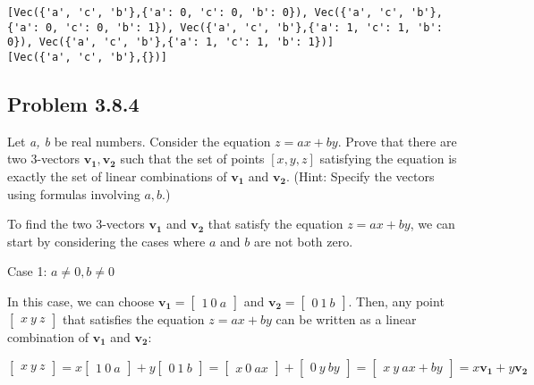 \documentclass[
  letterpaper,
  DIV=11,
  numbers=noendperiod]{scrartcl}
\begin{document}
\begin{lstlisting}
[Vec({'a', 'c', 'b'},{'a': 0, 'c': 0, 'b': 0}), Vec({'a', 'c', 'b'},{'a': 0, 'c': 0, 'b': 1}), Vec({'a', 'c', 'b'},{'a': 1, 'c': 1, 'b': 0}), Vec({'a', 'c', 'b'},{'a': 1, 'c': 1, 'b': 1})]
[Vec({'a', 'c', 'b'},{})]
\end{lstlisting}

\newpage{}

\hypertarget{problem-3.8.4}{%
\subsection{Problem 3.8.4}\label{problem-3.8.4}}

Let \emph{a, b} be real numbers. Consider the equation \(z = ax + by\).
Prove that there are two 3-vectors \(\bm{v_1}, \bm{v_2}\) such that the
set of points \([x, y, z]\) satisfying the equation is exactly the set
of linear combinations of \(\bm{v_1}\) and \(\bm{v_2}\). (Hint: Specify
the vectors using formulas involving \(a, b\).)

To find the two 3-vectors \(\mathbf{v_1}\) and \(\mathbf{v_2}\) that
satisfy the equation \(z = ax + by\), we can start by considering the
cases where \(a\) and \(b\) are not both zero.

Case 1: \(a \neq 0, b \neq 0\)

In this case, we can choose
\(\mathbf{v_1} = \begin{bmatrix} 1 \ 0 \ a \end{bmatrix}\) and
\(\mathbf{v_2} = \begin{bmatrix} 0 \ 1 \ b \end{bmatrix}\). Then, any
point \(\begin{bmatrix} x \ y \ z \end{bmatrix}\) that satisfies the
equation \(z = ax + by\) can be written as a linear combination of
\(\mathbf{v_1}\) and \(\mathbf{v_2}\):

\(\begin{bmatrix} x \ y \ z \end{bmatrix} = x\begin{bmatrix} 1 \ 0 \ a \end{bmatrix} + y\begin{bmatrix} 0 \ 1 \ b \end{bmatrix} = \begin{bmatrix} x \ 0 \ ax \end{bmatrix} + \begin{bmatrix} 0 \ y \ by \end{bmatrix} = \begin{bmatrix} x \ y \ ax + by \end{bmatrix} = x\mathbf{v_1} + y\mathbf{v_2}\)
\end{document}
